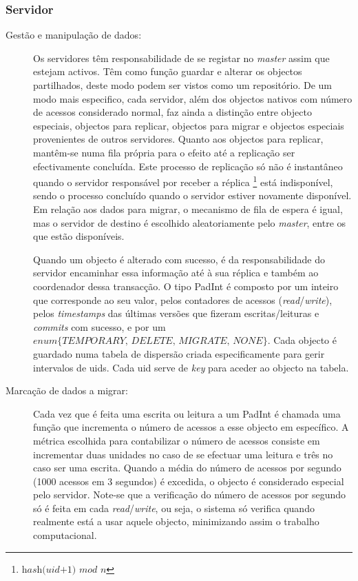 \subsubsection{Servidor}

\begin{description}

\item[Gestão e manipulação de dados:]
Os servidores têm responsabilidade de se registar no \textit{master} assim que estejam activos. Têm como função guardar e alterar os objectos partilhados, deste modo podem ser vistos como um repositório. De um modo mais especifico, cada servidor, além dos objectos nativos com número de acessos considerado normal, faz ainda a distinção entre objecto especiais, objectos para replicar, objectos para migrar e objectos especiais provenientes de outros servidores. Quanto aos objectos para replicar, mantêm-se numa fila própria para o efeito até a replicação ser efectivamente concluída. Este processo de replicação só não é instantâneo quando o servidor responsável por receber a réplica \footnote{$ \textit{hash(uid+1) mod n} $} está indisponível, sendo o processo concluído quando o servidor estiver novamente disponível. Em relação aos dados para migrar, o mecanismo de fila de espera é igual, mas o servidor de destino é escolhido aleatoriamente pelo \textit{master}, entre os que estão disponíveis. 

Quando um objecto é alterado com sucesso, é da responsabilidade do servidor encaminhar essa informação até à sua réplica e também ao coordenador dessa transacção. O tipo PadInt é composto por um inteiro que corresponde ao seu valor, pelos contadores de acessos (\textit{read}/\textit{write}), pelos \textit{timestamps} das últimas versões que fizeram escritas/leituras e \textit{commits} com sucesso, e por um $\textit{enum\{TEMPORARY, DELETE, MIGRATE, NONE\}}$. Cada objecto é guardado numa tabela de dispersão criada especificamente para gerir intervalos de uids. Cada uid serve de \textit{key} para aceder ao objecto na tabela. 

\item[Marcação de dados a migrar:]
Cada vez que é feita uma escrita ou leitura a um PadInt é chamada uma função que incrementa  o número de acessos a esse objecto em específico. A métrica escolhida para contabilizar o número de acessos consiste em incrementar duas unidades no caso de se efectuar uma leitura e três no caso ser uma escrita. Quando a média do número de acessos por segundo (1000 acessos em 3 segundos) é excedida, o objecto é considerado especial pelo servidor. Note-se que a verificação do número de acessos por segundo só é feita em cada \textit{read}/\textit{write}, ou seja, o sistema só verifica quando realmente está a usar aquele objecto, minimizando assim o trabalho computacional. 


\end{description}
